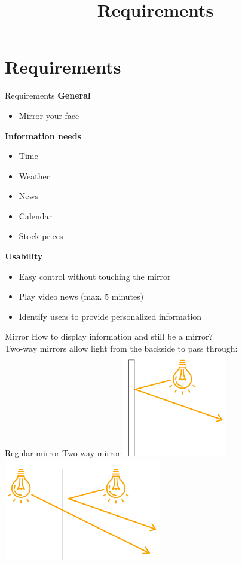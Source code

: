 \documentclass[xcolor=svgnames,handout,aspectratio=169]{beamer}
\begin{document}
\section{Requirements}
\title[Requirements]{Requirements}

\begin{frame}
	{Requirements}
	\textbf{General}
	\begin{itemize}
		\item Mirror your face
	\end{itemize}
	\vspace{5mm}

	\textbf{Information needs}
	\begin{itemize}
		\item Time
		\item Weather
		\item News
		\item Calendar
		\item Stock prices
	\end{itemize}
	
	\vspace{5mm}
	
	\textbf{Usability}
	\begin{itemize}
		\item Easy control without touching the mirror
		\item Play video news (max. 5 minutes)
		\item Identify users to provide personalized information
	\end{itemize}
\end{frame}

\begin{frame}
	{Mirror}
	How to display information and still be a mirror?\\
	Two-way mirrors allow light from the backside to pass through:\\
	\vspace{0.5cm}
	\hspace{1cm} Regular mirror \hspace{5cm} Two-way mirror
	\includegraphics[height=4.5cm]{images/smartmirror_principle.png}
	\hspace{1.5cm}
	\includegraphics[height=4.5cm]{images/smartmirror_principle_2.png}
\end{frame}
\end{document}
